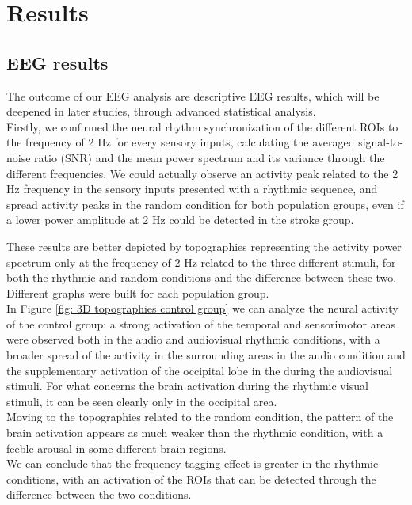 \chapter{Results}
\section{EEG results}
The outcome of our EEG analysis are descriptive EEG results, which will be deepened in later studies, through advanced statistical analysis.\\ 
Firstly, we confirmed the neural rhythm synchronization of the different ROIs to the frequency of 2 Hz for every sensory inputs, calculating the averaged signal-to-noise ratio (SNR) and the mean power spectrum and its variance through the different frequencies. We could actually observe an activity peak related to the 2 Hz frequency in the sensory inputs presented with a rhythmic sequence, and spread activity peaks in the random condition for both population groups, even if a lower power amplitude at 2 Hz could be detected in the stroke group. 

These results are better depicted by topographies representing the activity power spectrum only at the frequency of 2 Hz 
related to the three different stimuli, for both the rhythmic and random conditions and the difference between these two. Different graphs were built for each population group. \\
In Figure \ref{fig: 3D topographies control group} we can analyze the neural activity of the control group: a strong activation of the temporal and sensorimotor areas were observed both in the audio and audiovisual rhythmic conditions, with a broader spread of the activity in the surrounding areas in the audio condition and the supplementary activation of the occipital lobe in the during the audiovisual stimuli. For what concerns the brain activation during the rhythmic visual stimuli, it can be seen clearly only in the occipital area. \\
Moving to the topographies related to the random condition, the pattern of the brain activation appears as much weaker than the rhythmic condition, with a feeble arousal in some different brain regions. \\
We can conclude that the frequency tagging effect is greater in the rhythmic conditions, with an activation of the ROIs that can be detected through the difference between the two conditions. 

